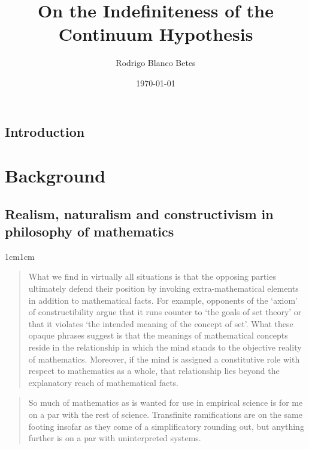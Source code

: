 \documentclass[11pt,a4paper]{book}
\title{\textbf{On the Indefiniteness of the Continuum Hypothesis}}
\author{Rodrigo Blanco Betes}
\date{\today}
\theoremstyle{plain}
\begin{document}
\frontmatter
\maketitle

\tableofcontents

\section*{Introduction}


\mainmatter

\chapter{Background}

\section{Realism, naturalism and constructivism in philosophy of mathematics}

\begin{adjustwidth}{1cm}{1cm}
  \small
  \begin{quote}
What we find in virtually all situations is that the opposing parties ultimately defend their position by invoking extra-mathematical elements in addition to mathematical facts. For example, opponents of the ‘axiom’ of constructibility argue that it runs counter to ‘the goals of set theory’ or that it violates ‘the intended meaning of the concept of set’. What these opaque phrases suggest is that the meanings of mathematical concepts reside in the relationship in which the mind stands to the objective reality of mathematics. Moreover, if the mind is assigned a constitutive role with respect to mathematics as a whole, that relationship lies beyond the explanatory reach of mathematical facts. \parencite[p. 103]{hauser2004}
  \end{quote}
\end{adjustwidth}

\begin{quote}
So much of mathematics as is wanted for use in empirical science is for me on a par with the rest of science. Transfinite ramifications are on the same footing insofar as they come of a simplificatory rounding out, but anything further is on a par with uninterpreted systems. \textcite[p. 788]{quine1984}
\end{quote} 
\end{document}
